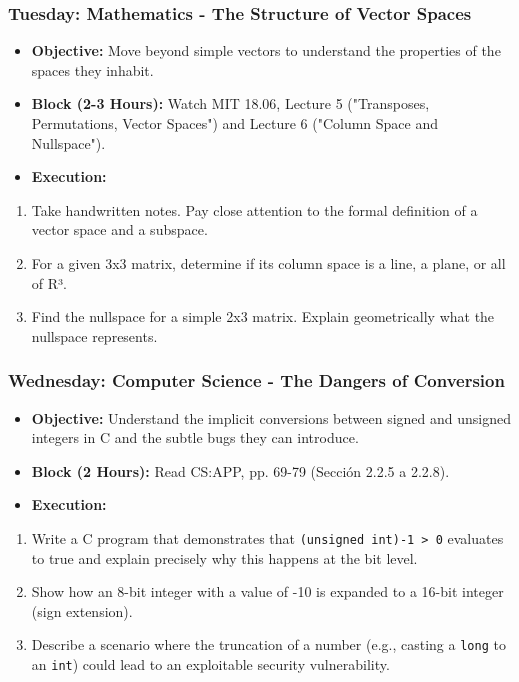 \documentclass[11pt,a4paper]{report}
\begin{document}
\subsubsection{\textbf{Tuesday: Mathematics - The Structure of Vector Spaces}}
\begin{itemize}
  \item \textbf{Objective:} Move beyond simple vectors to understand the properties of the spaces they inhabit.
  \item \textbf{Block (2-3 Hours):} Watch MIT 18.06, Lecture 5 ("Transposes, Permutations, Vector Spaces") and Lecture 6 ("Column Space and Nullspace").
  \item \textbf{Execution:}
\end{itemize}
\begin{enumerate}
  \item Take handwritten notes. Pay close attention to the formal definition of a vector space and a subspace.
  \item For a given 3x3 matrix, determine if its column space is a line, a plane, or all of R³.
  \item Find the nullspace for a simple 2x3 matrix. Explain geometrically what the nullspace represents.

\end{enumerate}
\subsubsection{\textbf{Wednesday: Computer Science - The Dangers of Conversion}}
\begin{itemize}
  \item \textbf{Objective:} Understand the implicit conversions between signed and unsigned integers in C and the subtle bugs they can introduce.
  \item \textbf{Block (2 Hours):} Read CS:APP, pp. 69-79 (Sección 2.2.5 a 2.2.8).
  \item \textbf{Execution:}
\end{itemize}
\begin{enumerate}
  \item Write a C program that demonstrates that \texttt{(unsigned int)-1 \textgreater{} 0} evaluates to true and explain precisely why this happens at the bit level.
  \item Show how an 8-bit integer with a value of -10 is expanded to a 16-bit integer (sign extension).
  \item Describe a scenario where the truncation of a number (e.g., casting a \texttt{long} to an \texttt{int}) could lead to an exploitable security vulnerability.

\end{enumerate}
\end{document}
